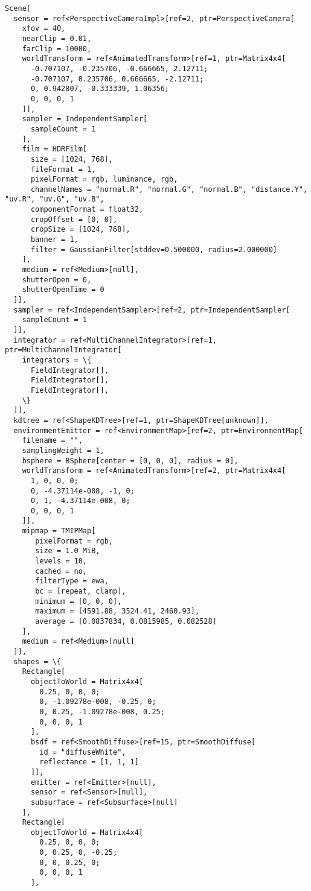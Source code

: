 \documentclass[11pt, a4paper, landscape]{scrartcl}
\begin{document}
    \begin{Verbatim}[commandchars=\\\{\}]
Scene[
  sensor = ref<PerspectiveCameraImpl>[ref=2, ptr=PerspectiveCamera[
    xfov = 40,
    nearClip = 0.01,
    farClip = 10000,
    worldTransform = ref<AnimatedTransform>[ref=1, ptr=Matrix4x4[
      -0.707107, -0.235706, -0.666665, 2.12711;
      -0.707107, 0.235706, 0.666665, -2.12711;
      0, 0.942807, -0.333339, 1.06356;
      0, 0, 0, 1
    ]],
    sampler = IndependentSampler[
      sampleCount = 1
    ],
    film = HDRFilm[
      size = [1024, 768],
      fileFormat = 1,
      pixelFormat = rgb, luminance, rgb, 
      channelNames = "normal.R", "normal.G", "normal.B", "distance.Y", "uv.R", "uv.G", "uv.B", 
      componentFormat = float32,
      cropOffset = [0, 0],
      cropSize = [1024, 768],
      banner = 1,
      filter = GaussianFilter[stddev=0.500000, radius=2.000000]
    ],
    medium = ref<Medium>[null],
    shutterOpen = 0,
    shutterOpenTime = 0
  ]],
  sampler = ref<IndependentSampler>[ref=2, ptr=IndependentSampler[
    sampleCount = 1
  ]],
  integrator = ref<MultiChannelIntegrator>[ref=1, ptr=MultiChannelIntegrator[
    integrators = \{
      FieldIntegrator[],
      FieldIntegrator[],
      FieldIntegrator[],
    \}
  ]],
  kdtree = ref<ShapeKDTree>[ref=1, ptr=ShapeKDTree[unknown]],
  environmentEmitter = ref<EnvironmentMap>[ref=2, ptr=EnvironmentMap[
    filename = "",
    samplingWeight = 1,
    bsphere = BSphere[center = [0, 0, 0], radius = 0],
    worldTransform = ref<AnimatedTransform>[ref=2, ptr=Matrix4x4[
      1, 0, 0, 0;
      0, -4.37114e-008, -1, 0;
      0, 1, -4.37114e-008, 0;
      0, 0, 0, 1
    ]],
    mipmap = TMIPMap[
       pixelFormat = rgb,
       size = 1.0 MiB,
       levels = 10,
       cached = no,
       filterType = ewa,
       bc = [repeat, clamp],
       minimum = [0, 0, 0],
       maximum = [4591.88, 3524.41, 2460.93],
       average = [0.0837834, 0.0815985, 0.082528]
    ],
    medium = ref<Medium>[null]
  ]],
  shapes = \{
    Rectangle[
      objectToWorld = Matrix4x4[
        0.25, 0, 0, 0;
        0, -1.09278e-008, -0.25, 0;
        0, 0.25, -1.09278e-008, 0.25;
        0, 0, 0, 1
      ],
      bsdf = ref<SmoothDiffuse>[ref=15, ptr=SmoothDiffuse[
        id = "diffuseWhite",
        reflectance = [1, 1, 1]
      ]],
      emitter = ref<Emitter>[null],
      sensor = ref<Sensor>[null],
      subsurface = ref<Subsurface>[null]
    ],
    Rectangle[
      objectToWorld = Matrix4x4[
        0.25, 0, 0, 0;
        0, 0.25, 0, -0.25;
        0, 0, 0.25, 0;
        0, 0, 0, 1
      ],

\end{Verbatim}
\end{document}
